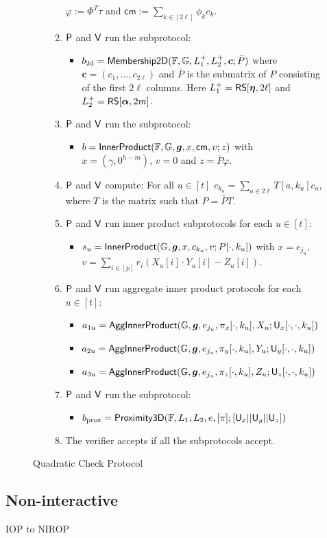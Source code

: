 \begin{figure}[h!]
\begin{framed}
\begin{itemize}
\begin{enumerate}[{\rm 1.}]
$\varphi := \Phi^T\tau$ and $\mathsf{cm}:= \sum_{k\in [2\ell]}\phi_kc_k$.
\item $\mathsf{P}$ and $\mathsf{V}$ run the subprotocol:
	\begin{itemize}
	\item $b_{\rm
2d}=\mathsf{Membership2D}(\mathbb{F},\mathbb{G},L^{+}_1,L^{+}_2,\bm{c};\bar{P})$ where
$\bm{c}=(c_1,\ldots,c_{2\ell})$ and $\bar{P}$ is the submatrix of $P$ consisting
of the first $2\ell$ columns. Here $L^{+}_1=\mathsf{RS}[\bm{\eta},2\ell]$ and
$L^{+}_2=\mathsf{RS}[\bm{\alpha},2m]$.
	\end{itemize}
\item $\mathsf{P}$ and $\mathsf{V}$ run the subprotocol:
	\begin{itemize}
	\item $b=\mathsf{InnerProduct}(\mathbb{F},\mathbb{G},\bm{g},x,\mathsf{cm},v;z)$
with $x=(\gamma,0^{h-m})$, $v=0$ and $z=\bar{P}\varphi$.
	\end{itemize}
\item $\mathsf{P}$ and $\mathsf{V}$ compute: For all $u\in [t]$ $c_{k_u} =
\sum_{a\in 2\ell}T[a,k_u]c_a$, where $T$ is the matrix such that $P=\bar{P}T$.
\item $\mathsf{P}$ and $\mathsf{V}$ run inner product subprotocols for each $u\in
[t]$:
	\begin{itemize}
	\item $s_u=\mathsf{InnerProduct}(\mathbb{G},\bm{g},x,c_{k_u},v;P[\cdot,k_u])$ with
$x=e_{j_u}$, $v=\sum_{i\in [p]}r_i(X_u[i]\cdot Y_u[i] - Z_u[i])$.
	\end{itemize}
\item $\mathsf{P}$ and $\mathsf{V}$ run aggregate inner product protocols for each
$u\in [t]$:
	\begin{itemize}
	\item
$a_{1u}=\mathsf{AggInnerProduct}(\mathbb{G},\bm{g},e_{j_u},\pi_x[\cdot,k_u],X_u;\mathsf{U}_x[\cdot,\cdot,k_u])$
	\item
$a_{2u}=\mathsf{AggInnerProduct}(\mathbb{G},\bm{g},e_{j_u},\pi_y[\cdot,k_u],Y_u;\mathsf{U}_y[\cdot,\cdot,k_u])$
	\item
$a_{3u}=\mathsf{AggInnerProduct}(\mathbb{G},\bm{g},e_{j_u},\pi_z[\cdot,k_u],Z_u;\mathsf{U}_z[\cdot,\cdot,k_u])$
	\end{itemize}
\item $\mathsf{P}$ and $\mathsf{V}$ run the subprotocol: 
	\begin{itemize}
	\item $b_{\rm prox} =
\mathsf{Proximity3D}(\mathbb{F},L_1,L_2,e,[\pi];[\mathsf{U}_x||\mathsf{U}_y||\mathsf{U}_z])$
	\end{itemize}
\item The verifier accepts if all the subprotocols accept.
\end{enumerate}
\end{itemize}
\end{framed}
\caption{Quadratic Check Protocol}
\label{fig:quadcheck}
\end{figure}



   



\subsection{Non-interactive}
IOP to NIROP
